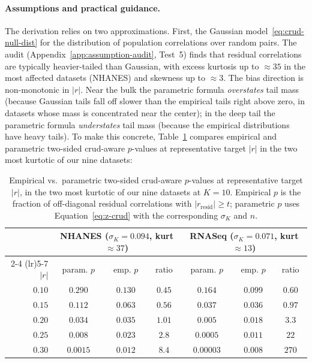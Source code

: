 \paragraph{Assumptions and practical guidance.}
The derivation relies on two approximations.
First, the Gaussian model~\eqref{eq:crud-null-dist} for the distribution of population correlations over random pairs.
The audit (Appendix~\ref{app:assumption-audit}, Test~5) finds that residual correlations are typically heavier-tailed than Gaussian, with excess kurtosis up to $\approx 35$ in the most affected datasets (NHANES) and skewness up to $\approx 3$.
The bias direction is non-monotonic in $|r|$. Near the bulk the parametric formula \emph{overstates} tail mass (because Gaussian tails fall off slower than the empirical tails right above zero, in datasets whose mass is concentrated near the center); in the deep tail the parametric formula \emph{understates} tail mass (because the empirical distributions have heavy tails). To make this concrete, Table~\ref{tab:heavy-tail-cal} compares empirical and parametric two-sided crud-aware $p$-values at representative target $|r|$ in the two most kurtotic of our nine datasets:

\begin{table}[h]
\centering
\caption{Empirical vs.\ parametric two-sided crud-aware $p$-values at representative target $|r|$, in the two most kurtotic of our nine datasets at $K=10$. Empirical $p$ is the fraction of off-diagonal residual correlations with $|r_{\text{resid}}|\ge t$; parametric $p$ uses Equation~\eqref{eq:z-crud} with the corresponding $\sigma_K$ and $n$.}
\label{tab:heavy-tail-cal}
\begin{tabular}{rcccccc}
\toprule
& \multicolumn{3}{c}{NHANES ($\sigma_K=0.094$, kurt $\approx 37$)} & \multicolumn{3}{c}{RNASeq ($\sigma_K=0.071$, kurt $\approx 13$)} \\
\cmidrule(lr){2-4} \cmidrule(lr){5-7}
$|r|$ & param. $p$ & emp. $p$ & ratio & param. $p$ & emp. $p$ & ratio \\
\midrule
$0.10$ & $0.290$ & $0.130$ & $0.45$ & $0.164$ & $0.099$ & $0.60$ \\
$0.15$ & $0.112$ & $0.063$ & $0.56$ & $0.037$ & $0.036$ & $0.97$ \\
$0.20$ & $0.034$ & $0.035$ & $1.01$ & $0.005$ & $0.018$ & $3.3$ \\
$0.25$ & $0.008$ & $0.023$ & $2.8$ & $0.0005$ & $0.011$ & $22$ \\
$0.30$ & $0.0015$ & $0.012$ & $8.4$ & $0.00003$ & $0.008$ & $270$ \\
\bottomrule
\end{tabular}
\end{table}

